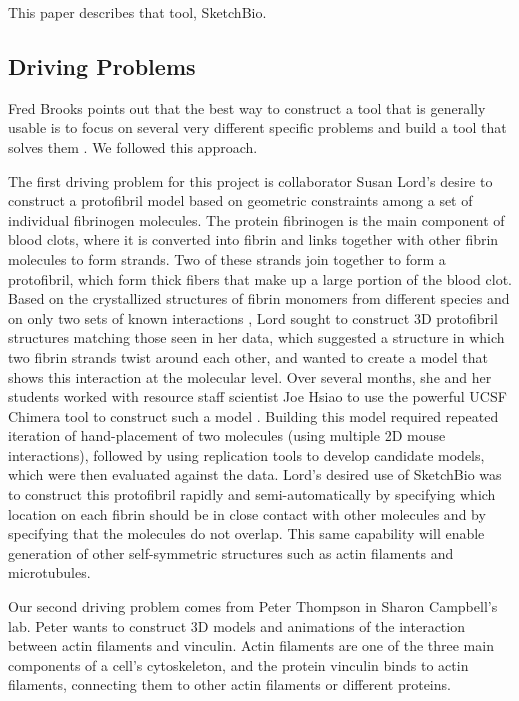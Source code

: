 \documentclass[twocolumn]{bmcart}%
\begin{document}
This paper describes that tool, SketchBio.

\subsection*{Driving Problems}
Fred Brooks points out that the best way to construct a tool that is generally usable is to focus on several very different specific problems and build a tool that solves them \cite{Brooks}.
We followed this approach.

The first driving problem for this project is collaborator Susan Lord's desire to construct a protofibril model based on geometric constraints among a set of individual fibrinogen molecules.
The protein fibrinogen is the main component of blood clots, where it is converted into fibrin and links together with other fibrin molecules to form strands.
Two of these strands join together to form a protofibril, which form thick fibers that make up a large portion of the blood clot.
Based on the crystallized structures of fibrin monomers from different species and on only two sets of known interactions \cite{lord2007fibrinogen}, Lord sought to construct 3D protofibril structures matching those seen in her data, which suggested a structure in which two fibrin strands twist around each other, and wanted to create a model that shows this interaction at the molecular level.
Over several months, she and her students worked with resource staff scientist Joe Hsiao to use the powerful UCSF Chimera tool to construct such a model \cite{lordSubmitted}.
Building this model required repeated iteration of hand-placement of two molecules (using multiple 2D mouse interactions), followed by using replication tools to develop candidate models, which were then evaluated against the data.
Lord's desired use of SketchBio was to construct this protofibril rapidly and semi-automatically by specifying which location on each fibrin should be in close contact with other molecules and by specifying that the molecules do not overlap.
This same capability will enable generation of other self-symmetric structures such as actin filaments and microtubules.

Our second driving problem comes from Peter Thompson in Sharon Campbell's lab.
Peter wants to construct 3D models and animations of the interaction between actin filaments and vinculin.
Actin filaments are one of the three main components of a cell's cytoskeleton, and the protein vinculin binds to actin filaments, connecting them to other actin filaments or different proteins.
\end{document}
